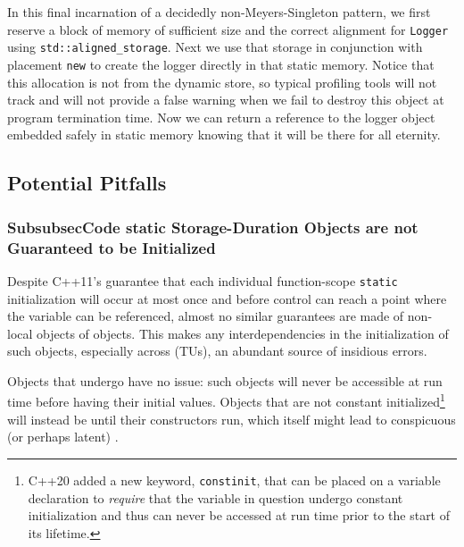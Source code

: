 \noindent In this final incarnation of a decidedly non-Meyers-Singleton pattern,
we first reserve a block of memory of sufficient size and the correct
alignment for \lstinline!Logger! using \linebreak[4]%
\lstinline!std::aligned_storage!. Next
we use that storage in conjunction with placement \lstinline!new! to create
the logger directly in that static memory. Notice that this allocation
is not from the dynamic store, so typical profiling tools will not track
and will not provide a false warning when we fail to destroy this object
at program termination time. Now we can return a reference to the logger
object embedded safely in static memory knowing that it will be there
for all eternity.

\subsection[Potential Pitfalls]{Potential Pitfalls}\label{potential-pitfalls-functionstatic}

\subsubsection[\tt{static} Storage-Duration Objects are not Guaranteed to be Initialized]{{SubsubsecCode static} Storage-Duration Objects are not Guaranteed to be Initialized}\label{static-storage-duration-objects-are-not-guaranteed-to-be-initialized}

Despite C++11's guarantee that each individual function-scope
\lstinline!static! initialization will occur at most once and before control can reach
a point where the variable can be referenced, almost no similar
guarantees are made of non-local objects of  objects.
This makes any interdependencies in the initialization of such objects, especially across
 (TUs), an abundant source of insidious
errors.

Objects that undergo  have no issue:
such objects will never be accessible at run time before having their
initial values. Objects that are not constant
initialized{\cprotect\footnote{C++20 added a new keyword,
\lstinline!constinit!, that can be placed on a variable declaration to
\emph{require} that the variable in question undergo constant
initialization and thus can never be accessed at run time prior to the
  start of its lifetime.}} will instead be 
until their constructors run, which itself might lead to conspicuous (or
perhaps latent) .

